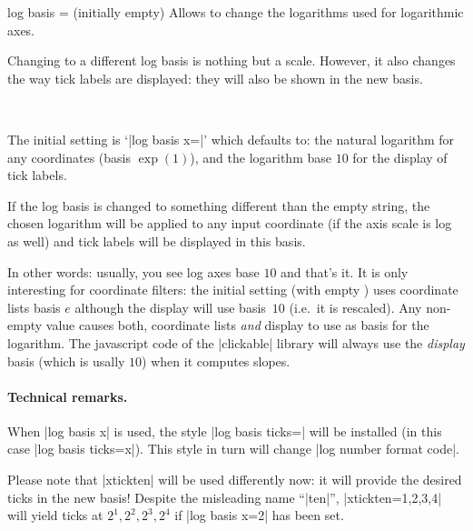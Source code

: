 \begin{pgfplotsxykey}{log basis \x= (initially empty)}
	Allows to change the logarithms used for logarithmic axes.

	Changing to a different log basis is nothing but a scale. However, it also changes the way tick labels are displayed: they will also be shown in the new basis.

\begin{codeexample}[]
~
\end{codeexample}
	
	The initial setting is `|log basis x=|' which defaults to: the natural logarithm for any coordinates (basis $\exp(1)$), and the logarithm base $10$ for the display of tick labels.

	If the log basis is changed to something different than the empty string, the chosen logarithm will be applied to any input coordinate (if the axis scale is log as well) and tick labels will be displayed in this basis. 

	In other words: usually, you see log axes base $10$ and that's it. It is only interesting for coordinate filters: 
	the initial setting (with empty ) uses coordinate lists basis $e$ although the display will use basis~$10$ (i.e.\ it is rescaled). Any non-empty value  causes both, coordinate lists \emph{and} display to use  as basis for the logarithm. The javascript code of the |clickable| library will always use the \emph{display} basis (which is usally $10$) when it computes slopes.

	\paragraph{Technical remarks.} When |log basis x| is used, the style |log basis ticks=| will be installed (in this case |log basis ticks=x|). This style in turn will change |log number format code|.

	Please note that |xtickten| will be used differently now: it will provide the desired ticks in the new basis! Despite the misleading name ``|ten|'', |xtickten={1,2,3,4}| will yield ticks at $2^1,2^2,2^3,2^4$ if |log basis x=2| has been set.
\end{pgfplotsxykey}

